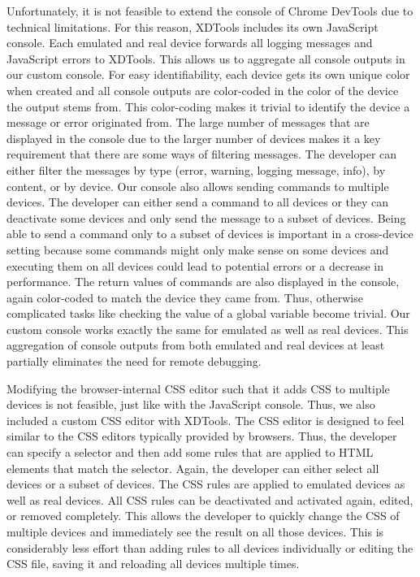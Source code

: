 Unfortunately, it is not feasible to extend the console of Chrome DevTools due to technical limitations. For this reason, XDTools includes its own JavaScript console. Each emulated and real device forwards all logging messages and JavaScript errors to XDTools. This allows us to aggregate all console outputs in our custom console. For easy identifiability, each device gets its own unique color when created and all console outputs are color-coded in the color of the device the output stems from. This color-coding makes it trivial to identify the device a message or error originated from. The large number of messages that are displayed in the console due to the larger number of devices makes it a key requirement that there are some ways of filtering messages. The developer can either filter the messages by type (error, warning, logging message, info), by content, or by device. Our console also allows sending commands to multiple devices. The developer can either send a command to all devices or they can deactivate some devices and only send the message to a subset of devices. Being able to send a command only to a subset of devices is important in a cross-device setting because some commands might only make sense on some devices and executing them on all devices could lead to potential errors or a decrease in performance. The return values of commands are also displayed in the console, again color-coded to match the device they came from. Thus, otherwise complicated tasks like checking the value of a global variable become trivial. Our custom console works exactly the same for emulated as well as real devices. This aggregation of console outputs from both emulated and real devices at least partially eliminates the need for remote debugging.

Modifying the browser-internal CSS editor such that it adds CSS to multiple devices is not feasible, just like with the JavaScript console. Thus, we also included a custom CSS editor with XDTools. The CSS editor is designed to feel similar to the CSS editors typically provided by browsers. Thus, the developer can specify a selector and then add some rules that are applied to HTML elements that match the selector. Again, the developer can either select all devices or a subset of devices. The CSS rules are applied to emulated devices as well as real devices. All CSS rules can be deactivated and activated again, edited, or removed completely. This allows the developer to quickly change the CSS of multiple devices and immediately see the result on all those devices. This is considerably less effort than adding rules to all devices individually or editing the CSS file, saving it and reloading all devices multiple times.


